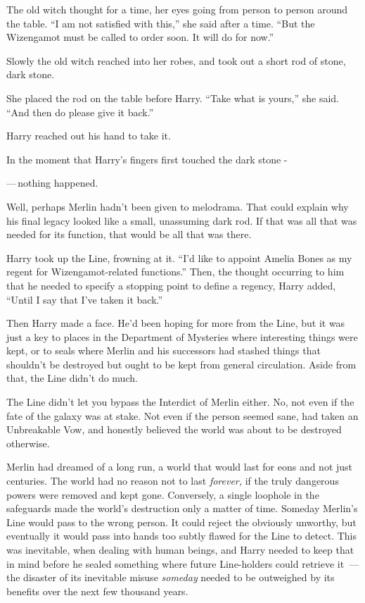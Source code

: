 The old witch thought for a time, her eyes going from person to person around the table. ``I am not satisfied with this,'' she said after a time. ``But the Wizengamot must be called to order soon. It will do for now.''

Slowly the old witch reached into her robes, and took out a short rod of stone, dark stone.

She placed the rod on the table before Harry. ``Take what is yours,'' she said. ``And then do please give it back.''

Harry reached out his hand to take it.

In the moment that Harry's fingers first touched the dark stone -

---\,nothing happened.

Well, perhaps Merlin hadn't been given to melodrama. That could explain why his final legacy looked like a small, unassuming dark rod. If that was all that was needed for its function, that would be all that was there.

Harry took up the Line, frowning at it. ``I'd like to appoint Amelia Bones as my regent for Wizengamot-related functions.'' Then, the thought occurring to him that he needed to specify a stopping point to define a regency, Harry added, ``Until I say that I've taken it back.''

Then Harry made a face. He'd been hoping for more from the Line, but it was just a key to places in the Department of Mysteries where interesting things were kept, or to seals where Merlin and his successors had stashed things that shouldn't be destroyed but ought to be kept from general circulation. Aside from that, the Line didn't do much.

The Line didn't let you bypass the Interdict of Merlin either. No, not even if the fate of the galaxy was at stake. Not even if the person seemed sane, had taken an Unbreakable Vow, and honestly believed the world was about to be destroyed otherwise.

Merlin had dreamed of a long run, a world that would last for eons and not just centuries. The world had no reason not to last \emph{forever,} if the truly dangerous powers were removed and kept gone. Conversely, a single loophole in the safeguards made the world's destruction only a matter of time. Someday Merlin's Line would pass to the wrong person. It could reject the obviously unworthy, but eventually it would pass into hands too subtly flawed for the Line to detect. This was inevitable, when dealing with human beings, and Harry needed to keep that in mind before he sealed something where future Line-holders could retrieve it~--- the disaster of its inevitable misuse \emph{someday} needed to be outweighed by its benefits over the next few thousand years.

